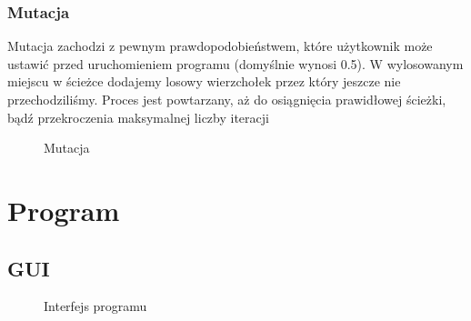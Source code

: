 \documentclass[a4paper,12pt]{article}
\begin{document}
\subsubsection{Mutacja}
Mutacja zachodzi z pewnym prawdopodobieństwem, które użytkownik może ustawić przed uruchomieniem programu (domyślnie wynosi 0.5). W wylosowanym miejscu w ścieżce dodajemy losowy wierzchołek przez który jeszcze nie przechodziliśmy. Proces jest powtarzany, aż do osiągnięcia prawidłowej ścieżki, bądź przekroczenia maksymalnej liczby iteracji
\begin{figure}[htbp]
\caption{Mutacja}
\end{figure}
\section{Program}
\subsection{GUI}
\begin{figure}[htbp]
\caption{Interfejs programu}
\end{figure}
\end{document}
